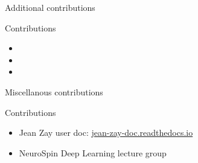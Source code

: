 \documentclass[aspectratio=169,xcolor=dvipsnames]{beamer}
\begin{document}
\begin{frame}{Additional contributions}
    \begin{exampleblock}{Contributions}
        \begin{itemize}
            \item {}
            \item {}
            \item {}
        \end{itemize}
    \end{exampleblock}
\end{frame}

\begin{frame}{Miscellanous contributions}
    \begin{exampleblock}{Contributions}
        \begin{itemize}
            \item Jean Zay user doc: \href{https://jean-zay-doc.readthedocs.io/}{jean-zay-doc.readthedocs.io}
            \item NeuroSpin Deep Learning lecture group
        \end{itemize}
    \end{exampleblock}
\end{frame}
\end{document}
